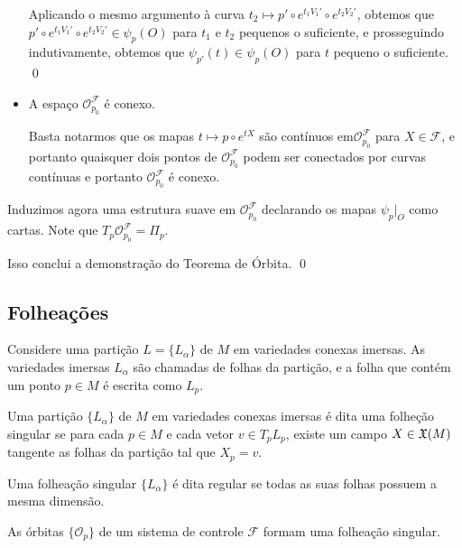 \begin{itemize}
    Aplicando o mesmo argumento à curva
    $t_2 \mapsto p' \circ e^{t_1V_1'} \circ e^{t_2V_2'}$,
    obtemos que $p' \circ e^{t_1V_1'} \circ e^{t_2V_2'} \in \psi_{p}(O)$ para
    $t_1$ e $t_2$ pequenos o suficiente, e prosseguindo indutivamente,
    obtemos que $\psi_{p'}(t) \in \psi_{p}(O)$ para $t$ pequeno o suficiente. \qed

    \item A espaço $\mathcal{O}_{p_0}^\mathcal{F}$ é conexo.
    
    Basta notarmos que os mapas $t \mapsto p \circ e^{tX}$ são contínuos
    em$\mathcal{O}_{p_0}^\mathcal{F}$
    para $X \in \mathcal{F}$, e portanto quaisquer dois pontos de
    $\mathcal{O}_{p_0}^\mathcal{F}$ podem ser conectados por curvas contínuas
    e portanto $\mathcal{O}_{p_0}^\mathcal{F}$ é conexo.

\end{itemize}

Induzimos agora uma estrutura suave em $\mathcal{O}_{p_0}^\mathcal{F}$ declarando
os mapas $\psi_p|_O$ como cartas. Note que $T_p \mathcal{O}_{p_0}^\mathcal{F} = \Pi_p$.


Isso conclui a demonstração do Teorema de Órbita. \qed

\subsection{Folheações}
Considere uma partição $L = \{L_\alpha\}$ de $M$ em variedades conexas imersas.
As variedades imersas $L_\alpha$ são chamadas de folhas da partição,
e a folha que contém um ponto $p \in M$ é escrita como $L_p$.

\begin{definition}
    Uma partição $\{L_\alpha\}$ de $M$ em variedades conexas imersas
    é dita uma folheção singular se para cada $p \in M$ e cada vetor
    $v \in T_p L_p$, existe um campo $X \in \mathfrak{X}(M)$ tangente as folhas da partição
    tal que $X_p = v$.
\end{definition}

\begin{definition}
    Uma folheação singular $\{L_\alpha\}$ é dita regular
    se todas as suas folhas possuem a mesma dimensão.
\end{definition}

\begin{theorem}
    As órbitas $\{\mathcal{O}_p\}$ de um sistema
    de controle $\mathcal{F}$ formam uma folheação singular.
\end{theorem}

